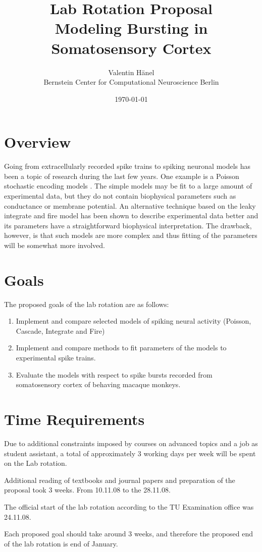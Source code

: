 \documentclass[10pt, twocolumn]{article}
\title{Lab Rotation Proposal \\ Modeling Bursting in Somatosensory
Cortex}
\author{Valentin H\"anel \\ \small Bernstein Center for
Computational Neuroscience Berlin}
\date{\today}
\begin{document}
 \maketitle

\section{Overview}

Going from extracellularly recorded spike trains to spiking neuronal
models has been a topic of research during the last few years. One
example is a Poisson stochastic encoding models  \cite{ BerryMeister, 
DayanAbbott}. The simple models may be fit to a large amount of
experimental data, but they do not contain biophysical parameters such
as conductance or membrane potential. An alternative technique based
on the leaky integrate and fire model \cite{PaninskiPillowSimoncelli}
has been shown to describe experimental data better and its parameters
have a straightforward biophysical interpretation. The drawback,
however, is that such models are more complex and thus fitting of the
parameters will be somewhat more involved. 

\section{Goals}

The proposed goals of the lab rotation are as follows:
\begin{enumerate}

    \item Implement and compare selected models of spiking neural
        activity (Poisson, Cascade, Integrate and Fire)
    \item Implement and compare methods to fit parameters of the
        models to experimental spike trains.
    \item Evaluate the models with respect to spike bursts recorded
        from somatosensory cortex of behaving macaque monkeys.

\end{enumerate}

\section{Time Requirements}

Due to additional constraints imposed by courses on advanced topics
and a job as student assistant, a total of approximately 3 working
days per week will be spent on the Lab rotation.

Additional reading of textbooks and journal papers and preparation of
the proposal took 3 weeks. From 10.11.08 to the 28.11.08.

The official start of the lab rotation according to the TU Examination
office was 24.11.08.

Each proposed goal should take around 3 weeks, and therefore the
proposed end of the lab rotation is end of January.

{  }
\end{document}
